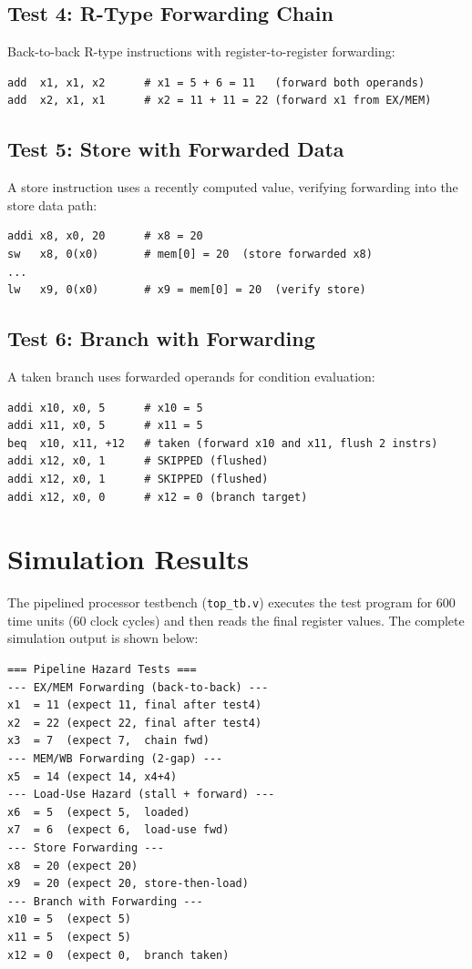\documentclass[12pt,a4paper]{report}
\begin{document}
\subsection{Test 4: R-Type Forwarding Chain}
Back-to-back R-type instructions with register-to-register forwarding:
\begin{lstlisting}[style=console]
add  x1, x1, x2      # x1 = 5 + 6 = 11   (forward both operands)
add  x2, x1, x1      # x2 = 11 + 11 = 22 (forward x1 from EX/MEM)
\end{lstlisting}

\subsection{Test 5: Store with Forwarded Data}
A store instruction uses a recently computed value, verifying forwarding into the
store data path:
\begin{lstlisting}[style=console]
addi x8, x0, 20      # x8 = 20
sw   x8, 0(x0)       # mem[0] = 20  (store forwarded x8)
...
lw   x9, 0(x0)       # x9 = mem[0] = 20  (verify store)
\end{lstlisting}

\subsection{Test 6: Branch with Forwarding}
A taken branch uses forwarded operands for condition evaluation:
\begin{lstlisting}[style=console]
addi x10, x0, 5      # x10 = 5
addi x11, x0, 5      # x11 = 5
beq  x10, x11, +12   # taken (forward x10 and x11, flush 2 instrs)
addi x12, x0, 1      # SKIPPED (flushed)
addi x12, x0, 1      # SKIPPED (flushed)
addi x12, x0, 0      # x12 = 0 (branch target)
\end{lstlisting}

\section{Simulation Results}
The pipelined processor testbench (\texttt{top\_tb.v}) executes the test program for
600 time units (60 clock cycles) and then reads the final register values. The
complete simulation output is shown below:

\begin{lstlisting}[style=console,caption={Complete Simulation Output},label={lst:simout}]
=== Pipeline Hazard Tests ===
--- EX/MEM Forwarding (back-to-back) ---
x1  = 11 (expect 11, final after test4)
x2  = 22 (expect 22, final after test4)
x3  = 7  (expect 7,  chain fwd)
--- MEM/WB Forwarding (2-gap) ---
x5  = 14 (expect 14, x4+4)
--- Load-Use Hazard (stall + forward) ---
x6  = 5  (expect 5,  loaded)
x7  = 6  (expect 6,  load-use fwd)
--- Store Forwarding ---
x8  = 20 (expect 20)
x9  = 20 (expect 20, store-then-load)
--- Branch with Forwarding ---
x10 = 5  (expect 5)
x11 = 5  (expect 5)
x12 = 0  (expect 0,  branch taken)
\end{lstlisting}
\end{document}
